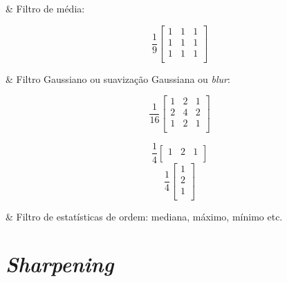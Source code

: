 \begin{easylist}

  & Filtro de média:

\end{easylist}

  \[ \frac 1 9
    \begin{bmatrix}
      1 & 1 & 1 \\
      1 & 1 & 1 \\
      1 & 1 & 1 \\
    \end{bmatrix}  
  \]

\begin{easylist}

  & Filtro Gaussiano ou suavização Gaussiana ou \textit{blur}:

\end{easylist}

  \[ \frac 1 {16}
    \begin{bmatrix}
      1 & 2 & 1 \\
      2 & 4 & 2 \\
      1 & 2 & 1 \\
    \end{bmatrix}  
  \]

  \[ \frac 1 4
    \begin{bmatrix}
      1 & 2 & 1 \\
    \end{bmatrix}  
  \]
  \[ \frac 1 4
    \begin{bmatrix}
      1 \\
      2 \\
      1 \\
    \end{bmatrix}  
  \]
  
\begin{easylist}

  & Filtro de estatísticas de ordem: mediana, máximo, mínimo etc.

\end{easylist}


\section{\emph{Sharpening}}

